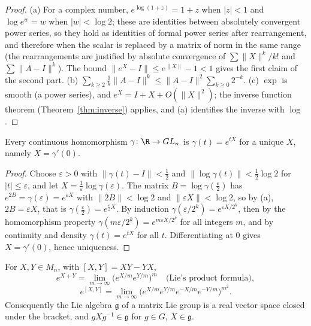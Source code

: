 \begin{proof}
(a) For a complex number, $e^{\log(1+z)}=1+z$ when $|z|<1$ and $\log e^w=w$ when $|w|<\log2$; these are identities between absolutely convergent power series, so they hold as identities of formal
power series after rearrangement, and therefore when the scalar is replaced by a matrix of norm in the same range (the rearrangements are justified by absolute convergence of
$\sum\|X\|^k/k!$ and $\sum\|A-I\|^k$). The bound $\|e^X-I\|\le e^{\|X\|}-1<1$ gives the first claim of the second part. (b) $\sum_{k\ge2}\frac1k\|A-I\|^k\le\|A-I\|^2\sum_{k\ge0}2^{-k}$. (c) $\exp$ is smooth (a power
series), and $e^{X}=I+X+O(\|X\|^2)$; the inverse function theorem (Theorem~\ref{thm:inverse}) applies, and (a) identifies the inverse with $\log$.
\end{proof}

\begin{proposition}\label{prop:oneparameter}
Every continuous homomorphism $\gamma\colon\R\to GL_n$ is $\gamma(t)=e^{tX}$ for a unique $X$, namely $X=\gamma'(0)$.
\end{proposition}

\begin{proof}
Choose $\varepsilon>0$ with $\|\gamma(t)-I\|<\frac12$ and $\|\log\gamma(t)\|<\frac12\log2$ for $|t|\le\varepsilon$, and let $X=\frac1\varepsilon\log\gamma(\varepsilon)$. The matrix $B=\log\gamma(\frac\varepsilon2)$ has $e^{2B}=\gamma(\varepsilon)=e^{\varepsilon X}$
with $\|2B\|<\log2$ and $\|\varepsilon X\|<\log2$, so by (a), $2B=\varepsilon X$, that is $\gamma(\frac\varepsilon2)=e^{\frac\varepsilon2X}$. By induction $\gamma(\varepsilon/2^k)=e^{\varepsilon X/2^k}$, then by the homomorphism property
$\gamma(m\varepsilon/2^k)=e^{m\varepsilon X/2^k}$ for all integers $m$, and by continuity and density $\gamma(t)=e^{tX}$ for all $t$. Differentiating at $0$ gives $X=\gamma'(0)$, hence uniqueness.
\end{proof}

\begin{proposition}\label{prop:liealgebra}
For $X,Y\in M_n$, with $[X,Y]=XY-YX$,
\[e^{X+Y}=\lim_{m\to\infty}\bigl(e^{X/m}e^{Y/m}\bigr)^m\quad\text{(Lie's product formula)},\]
\[e^{[X,Y]}=\lim_{m\to\infty}\bigl(e^{X/m}e^{Y/m}e^{-X/m}e^{-Y/m}\bigr)^{m^2}.\]
Consequently the Lie algebra $\mathfrak g$ of a matrix Lie group is a real vector space closed under the bracket, and $gXg^{-1}\in\mathfrak g$ for $g\in G$, $X\in\mathfrak g$.
\end{proposition}

